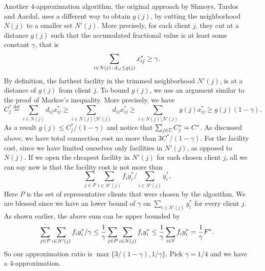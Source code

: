 \documentclass[oneside,final]{ucr}
\begin{document}
Another $4$-approximation algorithm, the original approach
by Shmoys, Tardos and Aardal, uses a different way to obtain
$g(j)$, by cutting the neighborhood $N(j)$ to a smaller set
$N'(j)$. More precisely, for each client $j$, they cut at a
distance $g(j)$ such that the accumulated fractional value
is at least some constant $\gamma$, that is
\begin{equation*}
  \sum_{i\in N(j){\,:\,} d_{ij} \leq g(j)} x_{ij}^\ast \geq \gamma.
\end{equation*}
By definition, the farthest facility in the trimmed
neighborhood $N'(j)$, is at a distance of $g(j)$ from client
$j$. To bound $g(j)$, we use an argument similar to the
proof of Markov's inequality. More precisely, we have
\begin{equation*}
  C_j^\ast \stackrel{\text{def}}{=} \sum_{i\in N(j)} d_{ij} x_{ij}^\ast \geq \sum_{i\in
    N(j)\setminus N'(j)} d_{ij} x_{ij}^\ast \geq \sum_{i \in N(j)
    \setminus N'(j)} g(j) x_{ij}^\ast \geq g(j) (1 - \gamma).
\end{equation*}
As a result $g(j) \leq C_j^\ast / (1 - \gamma)$ and notice
that $\sum_{j\in \mathbb{C}} C_j^\ast = C^\ast$. As
discussed above, we have total connection cost no more than
$3C^\ast/(1-\gamma)$. For the facility cost, since we have
limited ourselves only facilities in $N'(j)$, as opposed to
$N(j)$. If we open the cheapest facility in $N'(j)$ for each
chosen client $j$, all we can say now is that the facility
cost is not more than
\begin{equation*}
  \sum_{j \in P} \sum_{i\in N'(j)} f_i y_i^\ast / \sum_{i\in N'(j)} y_i^\ast.
\end{equation*}
Here $P$ is the set of representative clients that were
chosen by the algorithm.  We are blessed since we have an
lower bound of $\gamma$ on $\sum_{i\in N'(j)} y_i^\ast$ for
every client $j$. As shown earlier, the above sum can be
upper bounded by
\begin{equation*}
  \sum_{j \in P} \sum_{i\in N'(j)} f_i y_i^\ast / \gamma \leq
  \frac{1}{\gamma} \sum_{j \in P} \sum_{i \in N(j)} f_i y_i^\ast \leq
  \frac{1}{\gamma} \sum_{i \in \mathbb{F}} f_i y_i^\ast =
  \frac{1}{\gamma} F^\ast.
\end{equation*}
So our approximation ratio is $\max\{3/(1-\gamma),
1/\gamma\}$. Pick $\gamma=1/4$ and we have a
$4$-approximation.
\end{document}
